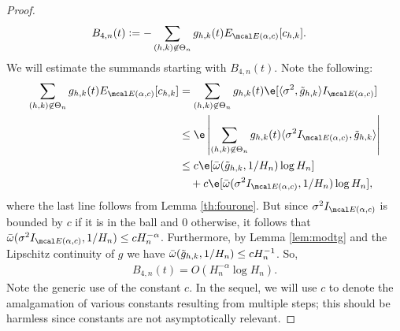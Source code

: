 \begin{appendices}
\begin{proof}
\begin{align}
  &B_{4,n}(t) := - \sum_{\substack{(h,k) \not\in \Theta_n }}g_{h,k}(t)\eind[\chk]. 
  \label{}
\end{align}
We will estimate the summands starting with $B_{4,n}(t)$. Note the following:
\begin{align}
  \sum_{\substack{(h,k) \not\in \Theta_n }}g_{h,k}(t)\eind[\chk] &=  \sum_{\substack{(h,k) \not\in \Theta_n }}g_{h,k}(t)\e[\inner{\sigma^2}{ \tghk}\indvol] \notag\\ 
&\le  \e\left\vert\sum_{\substack{(h,k) \not\in \Theta_n }}g_{h,k}(t)\inner{\sigma^2 \indvol}{ \tghk}\right\vert \notag\\
&\le c\e[\modc{\tghk}{1/H_n}\log H_n] \notag \\
&\quad + c\e[\modc{\sigma^2\indvol}{1/H_n} \log H_n]\notag,
\end{align}
where the last  line follows from Lemma \ref{th:fourone}. But since  $\sigma^2 \indvol$ is bounded by $c$ if it is in the \holder ball   and $0$ otherwise, it follows that $\modc{\sigma^2\indvol}{1/H_n} \le c H_n^{-\alpha}$. Furthermore, by Lemma \eqref{lem:modtg} and the Lipschitz continuity of $g$ we have ${\bar{\omega}}({\tilde{g}_{h,k}},1/H_n) \le c H^{-1}_n$.  So,  
\begin{align}
 B_{4,n}(t) =  O( H_n^{-\alpha}\log H_n).
  \label{eq:B4}
\end{align}
Note the generic use of the constant  $c$. In the sequel, we will use $c$ to denote the amalgamation of various constants resulting from multiple steps; this should be harmless since  constants are not asymptotically relevant. 


\end{proof}
\end{appendices}
